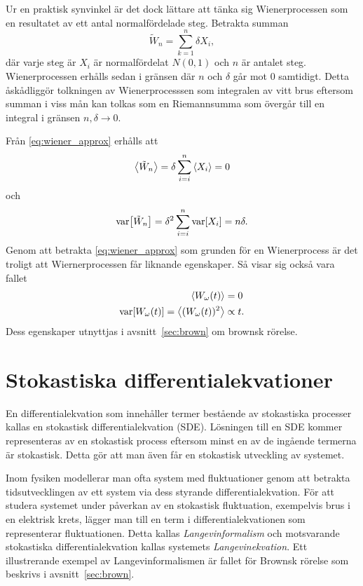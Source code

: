 Ur en praktisk synvinkel är det dock lättare att tänka sig Wienerprocessen som en resultatet av ett antal normalfördelade steg. Betrakta summan
\begin{equation}\label{eq:wiener_approx}
\tilde{W}_n = \sum_{k=1}^{n} \delta X_i,
\end{equation}
där varje steg är $X_i$ är normalfördelat $N(0,1)$ och $n$ är antalet steg. 
Wienerprocessen erhålls sedan i gränsen där $n$ och $\delta$ går mot $0$ samtidigt\cite{Miller_probability2012}. Detta åskådliggör tolkningen av Wienerprocesssen som integralen av vitt brus eftersom summan i viss mån kan tolkas som en Riemannsumma som övergår till en integral i gränsen $n, \delta \to 0$.

Från \eqref{eq:wiener_approx} erhålls att 
\begin{equation}
\ev{\tilde{W}_n} = \delta \sum_{i=i}^n \ev{X_i} = 0
\end{equation}
och
\begin{equation}
\text{var}\!\left[\tilde{W}_n\right] = \delta^2 \sum_{i=i}^n \text{var}\!\left[X_i\right] = n\delta.
\end{equation}
Genom att betrakta \eqref{eq:wiener_approx} som grunden för en Wienerprocess är det troligt att Wiernerprocessen får liknande egenskaper. Så visar sig också vara fallet~\cite{Miller_probability2012}
\begin{equation}
\begin{aligned}
\ev{W_\omega(t)} &= 0\\
\VAR{ W_\omega(t) } = \ev{ (W_\omega(t))^2 } &\propto t.
\end{aligned}
\end{equation}
Dess egenskaper utnyttjas i avsnitt~\ref{sec:brown} om brownsk rörelse.



\section{Stokastiska differentialekvationer}
En differentialekvation som innehåller termer bestående av stokastiska
processer kallas en stokastisk differentialekvation (SDE). Lösningen
till en SDE kommer representeras av en stokastisk process eftersom
minst en av de ingående termerna är stokastisk. Detta gör att man även
får en stokastisk utveckling av systemet. 

Inom fysiken modellerar man ofta system med fluktuationer genom
att betrakta tidsutvecklingen av ett system via dess styrande
differentialekvation. 
För att studera systemet under påverkan av en stokastisk fluktuation,
exempelvis brus i en elektrisk krets, lägger man till en term i
differentialekvationen som representerar fluktuationen. 
Detta kallas \emph{Langevinformalism} och motsvarande stokastiska
differentialekvation kallas systemets \emph{Langevinekvation}. 
Ett illustrerande exempel av Langevinformalismen är fallet för
Brownsk rörelse som beskrivs i avsnitt~\ref{sec:brown}.

